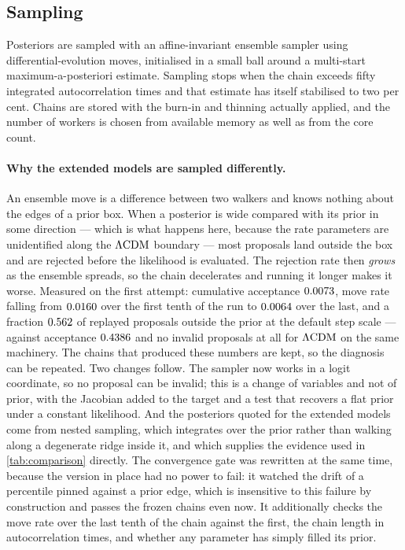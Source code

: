 \subsection{Sampling}\label{app:numerics-sampling}

Posteriors are sampled with an affine-invariant ensemble sampler using
differential-evolution moves, initialised in a small ball around a
multi-start maximum-a-posteriori estimate. Sampling stops when the chain
exceeds fifty integrated autocorrelation times and that estimate has itself
stabilised to two per cent. Chains are stored with the burn-in and thinning
actually applied, and the number of workers is chosen from available memory as
well as from the core count.

\paragraph{Why the extended models are sampled differently.} An ensemble move
is a difference between two walkers and knows nothing about the edges of a
prior box. When a posterior is wide compared with its prior in some direction
--- which is what happens here, because the rate parameters are unidentified
along the $\Lambda\mathrm{CDM}$ boundary --- most proposals land outside the box and are
rejected before the likelihood is evaluated. The rejection rate then
\emph{grows} as the ensemble spreads, so the chain decelerates and running it
longer makes it worse. Measured on the first attempt: cumulative acceptance
$0.0073$, move rate falling from
$0.0160$ over the first tenth of the run
to $0.0064$ over the last, and a fraction
$0.562$ of replayed proposals
outside the prior at the default step scale --- against acceptance
$0.4386$ and no invalid proposals at all for $\Lambda\mathrm{CDM}$ on
the same machinery. The chains that produced these numbers are kept, so the
diagnosis can be repeated. Two changes follow. The sampler now works in a logit coordinate, so
no proposal can be invalid; this is a change of variables and not of prior,
with the Jacobian added to the target and a test that recovers a flat prior
under a constant likelihood. And the posteriors quoted for the extended models
come from nested sampling, which integrates over the prior rather than walking
along a degenerate ridge inside it, and which supplies the evidence used in
\cref{tab:comparison} directly. The convergence gate was rewritten at the same
time, because the version in place had no power to fail: it watched the drift
of a percentile pinned against a prior edge, which is insensitive to this
failure by construction and passes the frozen chains even now. It additionally
checks the move rate over the last tenth of the chain against the first, the
chain length in autocorrelation times, and whether any parameter has simply
filled its prior.

